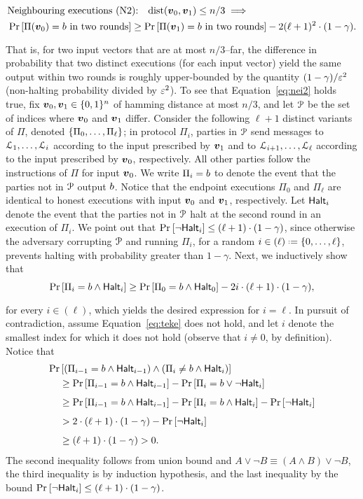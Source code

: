 \begin{align} \label{eq:nei2}
&\text{Neighbouring executions (N2):} \quad \mathrm{dist}({ \boldsymbol{v}}_0,{ \boldsymbol{v}}_1)\le n/3 \implies \\
& \Pr_{}\left[\Pi({ \boldsymbol{v}}_0)=b\text{ in two rounds}\right] \ge \Pr_{}\left[ \Pi({ \boldsymbol{v}}_1)=b\text{ in two rounds}\right] - 2 (\ell +1)^2 \cdot (1-\gamma). \nonumber
\end{align}
That is, for two input vectors that are at most $n/3$--far, the difference in probability that two distinct executions (for each input vector) yield the same output within two rounds is roughly upper-bounded by the quantity $(1-\gamma)/\varepsilon^2$ (\ie non-halting probability divided by $\varepsilon^2$). To see that Equation~\ref{eq:nei2} holds true, fix ${ \boldsymbol{v}}_0,{ \boldsymbol{v}}_1\in {\{0,1\}^n}$ of hamming distance at most $n/3$, and let $\mathcal{P}$ be the set of indices where ${ \boldsymbol{v}}_0$ and ${ \boldsymbol{v}}_1$ differ. Consider the following $\ell+1$ distinct variants of $\Pi$, denoted $\left\{\Pi_0,\ldots, \Pi_\ell\right\}$; in protocol $\Pi_i$, parties in $\mathcal{P}$ send messages to ${\cal{L}}_1,\ldots, {\cal{L}}_i$ according to the input prescribed by ${ \boldsymbol{v}}_1$ and to ${\cal{L}}_{i+1},\ldots, {\cal{L}}_\ell$ according to the input prescribed by ${ \boldsymbol{v}}_0$, respectively. All other parties follow the instructions of $\Pi$ for input ${ \boldsymbol{v}}_0$. We write $\Pi_i=b$ to denote the event that the parties not in $\mathcal{P}$ output $b$. Notice that the endpoint executions $\Pi_0$ and $\Pi_{\ell}$ are identical to honest executions with input ${ \boldsymbol{v}}_0$ and ${ \boldsymbol{v}}_1$, respectively. Let $\mathsf{Halt}_i$ denote the event that the parties not in $\mathcal{P}$ halt at the second round in an execution of $\Pi_{i}$. We point out that $\Pr_{}\left[ \neg \mathsf{Halt}_i\right]\le (\ell+1)\cdot (1-\gamma)$, since otherwise the adversary corrupting $\mathcal{P}$ and running $\Pi_i$, for a random $i\in (\ell) \assign \set{0,\ldots,\ell}$, prevents halting with probability greater than $1-\gamma$. Next, we inductively show that
\begin{align}
\Pr_{}\left[\Pi_i=b \land \mathsf{Halt}_i\right] \ge \Pr_{}\left[\Pi_{0} =b \land \mathsf{Halt}_0\right] - 2i\cdot (\ell+1) \cdot (1-\gamma),\label{eq:teke}
\end{align}
for every $i\in (\ell)$, which yields the desired expression for $i=\ell$. In pursuit of contradiction, assume Equation~\ref{eq:teke} does not hold, and let $i$ denote the smallest index for which it does not hold (observe that $i\ne 0$, by definition). Notice that
\begin{align*}
\Pr&\left[(\Pi_{i-1}= b \land \mathsf{Halt}_{i-1}) \land (\Pi_{i }\neq b\land \mathsf{Halt}_i)\right]\\
&\ge \Pr_{}\left[\Pi_{i-1}=b \land \mathsf{Halt}_{i-1}\right]-\Pr_{}\left[ \Pi_{i }= b\vee \neg \mathsf{Halt}_i\right]\\
&\ge \Pr_{}\left[\Pi_{i-1}=b \land \mathsf{Halt}_{i-1}\right]-\Pr_{}\left[ \Pi_{i }= b\land \mathsf{Halt}_i\right] - \Pr_{}\left[ \neg \mathsf{Halt}_i\right]\\
&> 2\cdot (\ell+1) \cdot (1-\gamma) - \Pr_{}\left[ \neg \mathsf{Halt}_i\right] \\
&\ge (\ell+1) \cdot (1-\gamma) > 0.
\end{align*}
The second inequality follows from union bound and $A\lor \neg B\equiv (A\land B) \lor \neg B$, the third inequality is by induction hypothesis, and the last inequality by the bound $\Pr_{}\left[ \neg \mathsf{Halt}_i\right]\le (\ell+1)\cdot (1-\gamma)$.

